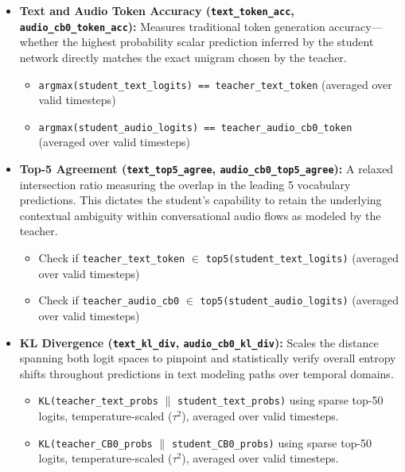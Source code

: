 \documentclass[12pt]{article}
\begin{document}
\begin{itemize}
    \item \textbf{Text and Audio Token Accuracy (\texttt{text\_token\_acc}, \texttt{audio\_cb0\_token\_acc}):} Measures traditional token generation accuracy---whether the highest probability scalar prediction inferred by the student network directly matches the exact unigram chosen by the teacher.
    \begin{itemize}
        \item \texttt{argmax(student\_text\_logits) == teacher\_text\_token} (averaged over valid timesteps)
        \item \texttt{argmax(student\_audio\_logits) == teacher\_audio\_cb0\_token} (averaged over valid timesteps)
    \end{itemize}

    \item \textbf{Top-5 Agreement (\texttt{text\_top5\_agree}, \texttt{audio\_cb0\_top5\_agree}):} A relaxed intersection ratio measuring the overlap in the leading 5 vocabulary predictions. This dictates the student’s capability to retain the underlying contextual ambiguity within conversational audio flows as modeled by the teacher.
    \begin{itemize}
        \item Check if \texttt{teacher\_text\_token} $\in$ \texttt{top5(student\_text\_logits)} (averaged over valid timesteps)
        \item Check if \texttt{teacher\_audio\_cb0} $\in$ \texttt{top5(student\_audio\_logits)} (averaged over valid timesteps)
    \end{itemize}

    \item \textbf{KL Divergence (\texttt{text\_kl\_div}, \texttt{audio\_cb0\_kl\_div}):} Scales the distance spanning both logit spaces to pinpoint and statistically verify overall entropy shifts throughout predictions in text modeling paths over temporal domains.
    \begin{itemize}
        \item \texttt{KL(teacher\_text\_probs} $\parallel$ \texttt{student\_text\_probs)} using sparse top-50 logits, temperature-scaled ($\tau^2$), averaged over valid timesteps.
        \item \texttt{KL(teacher\_CB0\_probs} $\parallel$ \texttt{student\_CB0\_probs)} using sparse top-50 logits, temperature-scaled ($\tau^2$), averaged over valid timesteps.
    \end{itemize}


\end{itemize}
\end{document}
